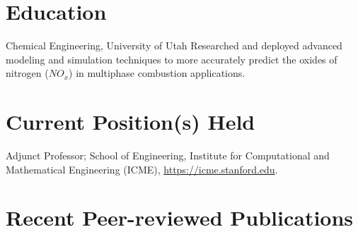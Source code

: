 \documentclass[letterpaper]{twentysecondcv_spd} %
\begin{document}

\section{Education}

\begin{twenty} %
	 {\normalfont Chemical Engineering, University of Utah} {Researched and deployed advanced
modeling and simulation techniques to more accurately predict the oxides of nitrogen ($NO_x$) in multiphase combustion applications.}
\end{twenty}


\section{Current Position(s) Held}

\begin{twentyshort} %
  	 {Adjunct Professor; School of Engineering, Institute for Computational and Mathematical Engineering (ICME), \underline{https://icme.stanford.edu}.}
  \end{twentyshort}


\section{Recent Peer-reviewed Publications}
\end{document}
